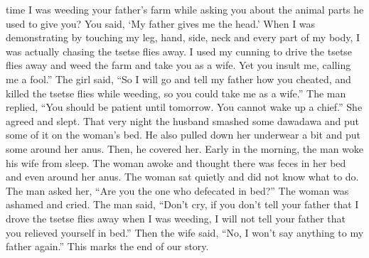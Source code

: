 time I was weeding your father’s farm while asking you about the animal parts
he used to give you? You said, `My father gives me the head.' When I was
demonstrating by touching my leg,  hand, side, neck and every 
part of my body,  I was actually chasing the tsetse ﬂies away. I used my
cunning to drive the tsetse ﬂies away and weed the farm and take you as a
wife. Yet you insult me, calling me a fool.” The girl said, “So I will go and
tell my father how you cheated, and  killed the tsetse
ﬂies while weeding, so you could take me as a wife.”  The man replied, “You
should be
patient
until tomorrow. You cannot wake up a chief.” She agreed and slept. That
very night the husband smashed some dawadawa and put some of it on the
woman’s bed. He also pulled down her underwear a bit and put some around
her anus.
 Then, he covered her. Early in the morning, the man woke  his wife from sleep.
The woman awoke and thought there was feces in her bed and even around her anus.
The woman sat quietly and did not
know what to do. The man asked her, “Are you the one who defecated 
in bed?” The woman was ashamed and cried. The man said, “Don’t cry, if
you don't tell your father that I drove the tsetse ﬂies away when I was weeding,
I
will not tell your father that you relieved yourself in bed.” Then the wife
said,
“No, I won’t say anything to my father again.” This marks the end of our
story.













